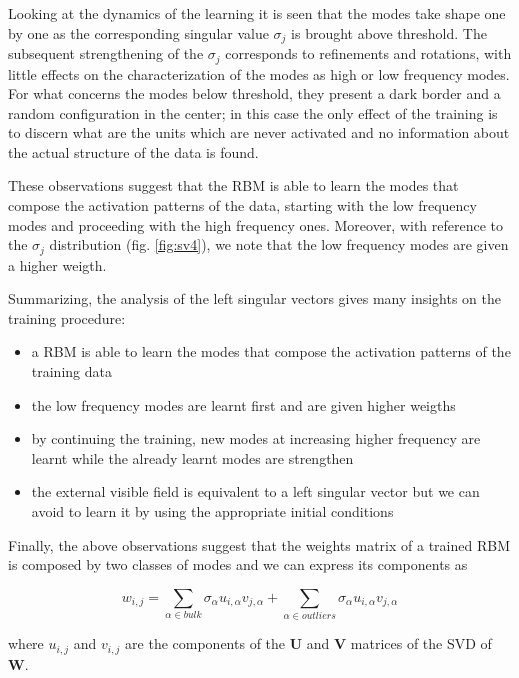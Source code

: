 \documentclass{revtex4-1}
\begin{document}
Looking at the dynamics of the learning it is seen that the modes take shape one by one as the corresponding singular value \(\sigma_j\) is brought above threshold. The subsequent strengthening of the \(\sigma_j\) corresponds to refinements and rotations, with little effects on the characterization of the modes as high or low frequency modes. For what concerns the modes below threshold, they present a dark border and a random configuration in the center; in this case the only effect of the training is to discern what are the units which are never activated and no information about the actual structure of the data is found.

These observations suggest that the RBM is able to learn the modes that compose the activation patterns of the data, starting with the low frequency modes and proceeding with the high frequency ones. Moreover, with reference to the \(\sigma_j\) distribution (fig. \ref{fig:sv4}), we note that the low frequency modes are given a higher weigth.

Summarizing, the analysis of the left singular vectors gives many insights on the training procedure:

\begin{itemize}
\item a RBM is able to learn the modes that compose the activation patterns of the training data
\item the low frequency modes are learnt first and are given higher weigths
\item by continuing the training, new modes at increasing higher frequency are learnt while the already learnt modes are strengthen
\item the external visible field is equivalent to a left singular vector but we can avoid to learn it by using the appropriate initial conditions
\end{itemize}

Finally, the above observations suggest that the weights matrix of a trained RBM is composed by two classes of modes and we can express its components as

\begin{equation}
w_{i,j} = \sum_{\alpha \in bulk} \sigma_{\alpha} u_{i,\alpha} v_{j,\alpha} + \sum_{\alpha \in outliers} \sigma_{\alpha} u_{i,\alpha} v_{j,\alpha} 
\end{equation}

where \(u_{i,j}\) and \(v_{i,j}\) are the components of the \(\mathbf{U}\) and \(\mathbf{V}\) matrices of the SVD of \(\mathbf{W}\).
\end{document}

